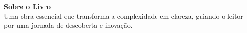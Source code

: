 \newpage
\thispagestyle{empty}
\pagecolor[HTML]{F4F6F9}
\color[HTML]{1A1A1A}
\vspace*{5cm}
\begin{center}
\begin{minipage}{0.8\textwidth}
{\Large \textbf{Sobre o Livro}}\\[1cm]
Uma obra essencial que transforma a complexidade em clareza, guiando o leitor por uma jornada de descoberta e inovação.
\end{minipage}
\end{center}
\vfill
\begin{center}
\end{center}
\nopagecolor
